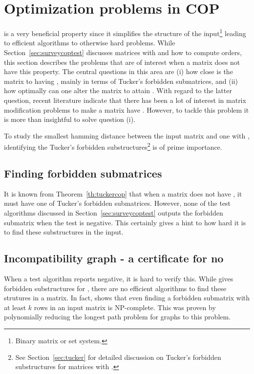 \section{Optimization problems in COP}
\label{sec:surveycopopt}

\COP is a very beneficial property since it simplifies the structure
of the input\footnote{Binary matrix or set system.} leading to
efficient algorithms to otherwise hard problems.  While
Section~\ref{sec:surveycoptest} discusses matrices with \COP and how
to compute \COP orders, this section describes the problems that are
of interest when a matrix does not have this property.  The central
questions in this area are (i) how close is the matrix to having \COP,
mainly in terms of Tucker's forbidden submatrices, and (ii) how
optimally can one alter the matrix to attain \COP.  With regard to the
latter question, recent literature indicate that there has been a lot
of interest in matrix modification problems to make a matrix have \COP
\cite{hg02, tz07}. However, to tackle this problem it is more than
insightful to solve question (i).

To study the smallest hamming distance  between the
input matrix and one with \COP, identifying the Tucker's forbidden
substructures\footnote{See Section~\ref{sec:tucker} for detailed
  discussion on Tucker's forbidden substructures for matrices with
  \COP.} is of prime importance. 

\subsection{Finding forbidden submatrices}
It is known from Theorem~\ref{th:tuckercop}
that when a matrix does not have \COP, it must have one of Tucker's
forbidden submatrices. However, none of the \COP test algorithms discussed in
Section~\ref{sec:surveycoptest} outputs the forbidden submatrix when
the test is negative. This certainly gives a hint to how hard it is to find
these substructures in the input. 






\subsection{Incompatibility graph - a certificate for no \COP}

When a \COP test algorithm reports negative, it is hard to verify
this. While \cite{at72} gives forbidden substructures for \COP, there
are no efficient algorithms to find these strutures in a matrix. In
fact, \cite{v82} shows that even finding a forbidden submatrix with at
least $k$ rows in an input matrix is NP-complete. This was proven by
polynomially reducing the longest path problem for graphs to this
problem.

